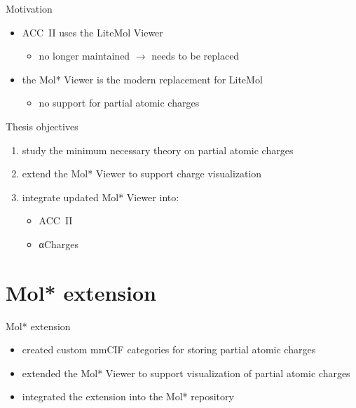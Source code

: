 \documentclass[
]{beamer}
\begin{document}
\begin{frame}{Motivation}
  \begin{itemize}
    \item ACC~II uses the LiteMol Viewer
    \begin{itemize}
      \item no longer maintained $\rightarrow$ needs to be replaced
    \end{itemize}
    \item the Mol* Viewer is the modern replacement for LiteMol
    \begin{itemize}
      \item no support for partial atomic charges
    \end{itemize}
  \end{itemize}
\end{frame}

\begin{frame}{Thesis objectives}
  \begin{enumerate}
    \item study the minimum necessary theory on partial atomic charges
    \item extend the Mol* Viewer to support charge visualization
    \item integrate updated Mol* Viewer into:
    \begin{itemize}
      \item ACC~II
      \item αCharges
    \end{itemize}
  \end{enumerate}
\end{frame}

\section{Mol* extension}

\begin{frame}{Mol* extension}
  \begin{itemize}
    \item created custom mmCIF categories for storing partial atomic charges
    \item extended the Mol* Viewer to support visualization of partial atomic charges
    \item integrated the extension into the Mol* repository
  \end{itemize}
\end{frame}
\end{document}
